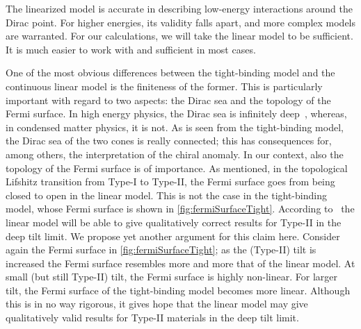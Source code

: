



The linearized model is accurate in describing low-energy interactions around the Dirac point.
For higher energies, its validity falls apart, and more complex models are warranted.
For our calculations, we will take the linear model to be sufficient.
It is much easier to work with and sufficient in most cases.

\label{sec:tilt:fermisurface-paragraph}
One of the most obvious differences between the tight-binding model and the continuous linear model is the finiteness of the former.
This is particularly important with regard to two aspects: the Dirac sea and the topology of the Fermi surface.
In high energy physics, the Dirac sea is infinitely deep~\cite{burkovTopologicalSemimetals2016,vozmedianoTheoreticalPhysicsColloquium2021}, whereas, in condensed matter physics, it is not.
As is seen from the tight-binding model, the Dirac sea of the two cones is really connected;
this has consequences for, among others, the interpretation of the chiral anomaly.
In our context, also the topology of the Fermi surface is of importance.
As mentioned, in the topological Lifshitz transition from Type-I to Type-II, the Fermi surface goes from being closed to open in the linear model.
This is not the case in the tight-binding model, whose Fermi surface is shown in \cref{fig:fermiSurfaceTight}.
According to~\textcite{ferreirosAnomalousNernstThermal2017} the linear model will be able to give qualitatively correct results for Type-II in the deep tilt limit.
We propose yet another argument for this claim here.
Consider again the Fermi surface in \cref{fig:fermiSurfaceTight};
as the (Type-II) tilt is increased the Fermi surface resembles more and more that of the linear model.
At small (but still Type-II) tilt, the Fermi surface is highly non-linear.
For larger tilt, the Fermi surface of the tight-binding model becomes more linear.
Although this is in no way rigorous, it gives hope that the linear model may give qualitatively valid results for Type-II materials in the deep tilt limit.


